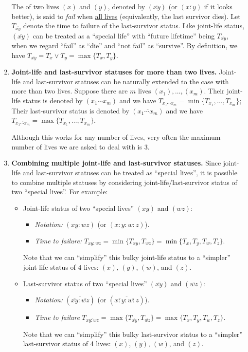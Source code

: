 \begin{enumerate}
The  of two lives \((x)\) and \((y)\), denoted by
\((\overline{xy})\) (or \((\overline{x\!:\!y})\) if it looks better), is said
to \emph{fail} when \underline{all lives}  
(equivalently, the last survivor dies). Let \(T_{\overline{xy}}\) denote the
time to failure of the last-survivor status. Like joint-life status,
\((\overline{xy})\) can be treated as a ``special life'' with ``future
lifetime'' being \(T_{\overline{xy}}\), when we regard ``fail'' as ``die'' and
``not fail'' as ``survive''. By definition, we have \(T_{\overline{xy}}=T_x\vee
T_y=\max\{T_x,T_y\}\).

\item \textbf{Joint-life and last-survivor statuses for more than two lives.}
Joint-life and last-survivor statuses can be naturally extended to the case
with more than two lives. Suppose there are \(m\) lives \((x_1),\dotsc,(x_m)\).
Their joint-life status is denoted by \((x_1\cdots x_m)\) and we have
\(T_{x_1\cdots x_m}=\min\{T_{x_1},\dotsc,T_{x_m}\}\); Their last-survivor
status is denoted by \((\overline{x_1\cdots x_m})\) and we have
\(T_{\overline{x_1\cdots x_m}}=\max\{T_{x_1},\dotsc,T_{x_m}\}\).

Although this works for any number of lives, very often the maximum number of
lives we are asked to deal with is 3.

\item \textbf{Combining multiple joint-life and last-survivor statuses.}
Since joint-life and last-survivor statuses can be treated as ``special
lives'', it is possible to combine multiple statuses by considering
joint-life/last-survivor status of two ``special lives''. For example:
\begin{itemize}
\item Joint-life status of two ``special lives'' \((xy)\) and \((wz)\):
\begin{itemize}
\item \emph{Notation:} \((xy\!:\!wz)\) (or \((x\!:\!y\!:\!w\!:\!z)\)).
\item \emph{Time to failure:} \(T_{xy:wz}=\min\{T_{xy},T_{wz}\}=\min\{T_{x},T_{y},T_{w},T_{z}\}\).
\end{itemize}
Note that we can ``simplify'' this bulky joint-life status to a ``simpler''
joint-life status of 4 lives: \((x)\), \((y)\), \((w)\), and \((z)\).
\item Last-survivor status of two ``special lives'' \((\overline{xy})\) and \((\overline{wz})\):
\begin{itemize}
\item \emph{Notation:} \((\overline{\overline{xy}\!:\!\overline{wz}})\)
(or \((\overline{\overline{x\!:\!y}\!:\!\overline{w\!:\!z}})\)).
\item \emph{Time to failure}
\(T_{\overline{xy:wz}}=\max\{T_{\overline{xy}},T_{\overline{wz}}\}
=\max\{T_{x},T_{y},T_{w},T_{z}\}\).
\end{itemize}
Note that we can ``simplify'' this bulky last-survivor status to a ``simpler''
last-survivor status of 4 lives: \((x)\), \((y)\), \((w)\), and \((z)\).


\end{itemize}
\end{enumerate}
